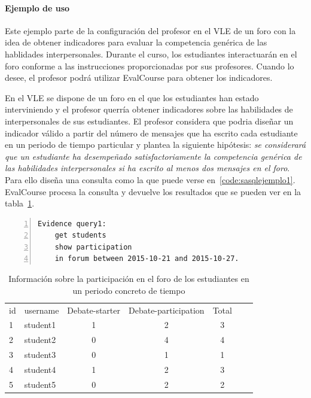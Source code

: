 \paragraph*{Ejemplo de uso}

Este ejemplo parte de la configuración del profesor en el VLE de un foro con la idea de obtener indicadores para evaluar la competencia genérica de las hablidades interpersonales. Durante el curso, los estudiantes interactuarán en el foro conforme a las instrucciones proporcionadas por sus profesores. Cuando lo desee, el profesor podrá utilizar EvalCourse para obtener los indicadores.



En el VLE se dispone de un foro en el que los estudiantes han estado interviniendo y el profesor querría obtener indicadores sobre las habilidades de interpersonales de sus estudiantes. El profesor considera que podria diseñar un indicador válido a partir del número de mensajes que ha escrito cada estudiante en un periodo de tiempo particular y plantea la siguiente hipótesis: \emph{se considerará que un estudiante ha desempeñado satisfactoriamente la competencia genérica de las habilidades interpersonales si ha escrito al menos dos mensajes en el foro}. Para ello diseña una consulta como la que puede verse en~\ref{code:sasqlejemplo1}. EvalCourse procesa la consulta y devuelve los resultados que se pueden ver en la tabla~\ref{tab:EvalCourseEj1}.

\begin{lstlisting}[caption=Participación en el foro en un periodo concreto de tiempo ,label=code:sasqlejemplo1,numbers=left, captionpos=b, morekeywords={Evidence,get, students, show, milestones, participation, access, in, assignment, forum, campus, workshop, interaction, between, and}]
Evidence query1: 
	get students
	show participation
	in forum between 2015-10-21 and 2015-10-27.
\end{lstlisting}

\begin{table}
	\centering
	\caption{Información sobre la participación en el foro de los estudiantes en un periodo concreto de tiempo}
	\label{tab:EvalCourseEj1}
	\begin{tabular}{llccccc}
		\hline\noalign{\smallskip}
		id & username & Debate-starter & Debate-participation & Total \\
		\noalign{\smallskip}
		\hline
		\noalign{\smallskip}
		1 & student1 & 1 & 2 & 3  \\
		2 & student2 & 0 & 4 & 4  \\
		3 & student3 & 0 & 1 & 1  \\
		4 & student4 & 1 & 2 & 3  \\
		5 & student5 & 0 & 2 & 2  \\
		\hline
	\end{tabular}
\end{table}

